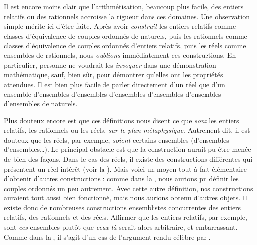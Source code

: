 \documentclass[11pt,a4paper,openany]{memoir}
\begin{document}
Il est encore moins clair que l'arithmétisation, beaucoup plus facile,
des entiers relatifs ou des rationnels accroisse la rigueur dans ces
domaines. Une observation simple mérite ici d'être faite. Après avoir
\emph{construit} les entiers relatifs comme classes d'équivalence de
couples ordonnés de naturels, puis les rationnels comme classes
d'équivalence de couples ordonnés d'entiers relatifs, puis les réels
comme ensembles de rationnels, nous \emph{oublions} immédiatement
ces constructions. En particulier, personne ne voudrait les
\emph{invoquer} dans une démonstration mathématique, sauf, bien sûr,
pour démontrer qu'elles ont les propriétés attendues. Il est bien
plus facile de parler directement d'un réel que d'un ensemble
d'ensembles d'ensembles d'ensembles d'ensembles d'ensembles d'ensembles
de naturels.
%
%
%

Plus douteux encore est que ces définitions nous disent ce que
\emph{sont} les entiers relatifs, les rationnels ou les réels,
\emph{sur le plan métaphysique}. Autrement dit, il est douteux que
les réels, par exemple, \emph{soient} certains ensembles
(d'ensembles d'ensembles\ldots). Le principal obstacle est que
la construction aurait pu être menée de bien des façons. Dans le
cas des réels, il existe des constructions différentes qui présentent
un réel intérêt (voir la ). Mais voici un moyen
tout à fait élémentaire d'obtenir d'autres constructions : comme
dans la , nous aurions pu définir les couples
ordonnés un peu autrement. Avec cette autre définition, nos
constructions auraient tout aussi bien fonctionné, mais nous aurions
obtenu d'autres objets. Il existe donc de nombreuses constructions
ensemblistes concurrentes des entiers relatifs, des rationnels et
des réels. Affirmer que les entiers relatifs, par exemple, sont
\emph{ces} ensembles plutôt que \emph{ceux-là} serait alors arbitraire,
et embarrassant. Comme dans la , il s'agit
d'un cas de l'argument rendu célèbre par \citealt{Benacerraf1965}.
\end{document}
